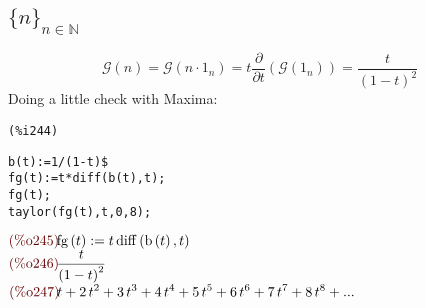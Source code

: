 \subsection{$\{n\}_{n\in \mathbb{N} }$}
\begin{displaymath}
  \mathcal{G} (n) = \mathcal{G} (n\cdot 1_n) = t
  \frac{\partial}{\partial t}\left( \mathcal{G} (1_n) \right) = \frac{t}{{\left( 1-t\right) }^{2}}
  \end{displaymath}
  Doing a little check with Maxima:
  
\noindent
\begin{minipage}[t]{8ex}{\color{red}\bf
\begin{verbatim}
(%i244) 
\end{verbatim}}
\end{minipage}
\begin{minipage}[t]{\textwidth}{\color{blue}
\begin{verbatim}
b(t):=1/(1-t)$
fg(t):=t*diff(b(t),t);
fg(t);
taylor(fg(t),t,0,8);
\end{verbatim}}
\end{minipage}
\begin{math}\displaystyle
\parbox{8ex}{\color{labelcolor}(\%o245) }
\mathrm{fg}\left( t\right) :=t\,\mathrm{diff}\left( \mathrm{b}\left( t\right) ,t\right) 
\end{math}\\
\begin{math}\displaystyle
\parbox{8ex}{\color{labelcolor}(\%o246) }
\frac{t}{{\left( 1-t\right) }^{2}}
\end{math}\\
\begin{math}\displaystyle
\parbox{8ex}{\color{labelcolor}(\%o247) }
t+2\,{t}^{2}+3\,{t}^{3}+4\,{t}^{4}+5\,{t}^{5}+6\,{t}^{6}+7\,{t}^{7}+8\,{t}^{8}+...
\end{math}

